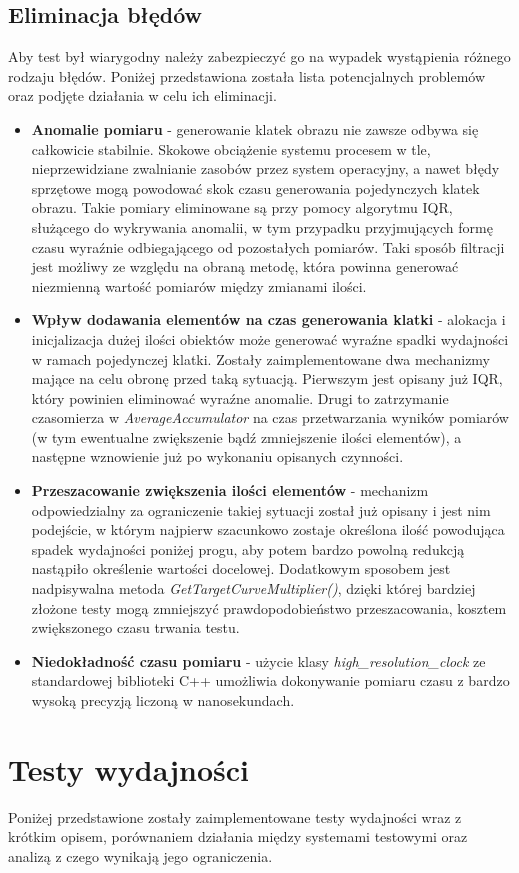 	\subsection{Eliminacja błędów}
	Aby test był wiarygodny należy zabezpieczyć go na wypadek wystąpienia różnego rodzaju błędów. Poniżej przedstawiona została lista potencjalnych problemów oraz podjęte działania w celu ich eliminacji.
	\begin{itemize}
		\item \textbf{Anomalie pomiaru} - generowanie klatek obrazu nie zawsze odbywa się całkowicie stabilnie. Skokowe obciążenie systemu procesem w tle, nieprzewidziane zwalnianie zasobów przez system operacyjny, a nawet błędy sprzętowe mogą powodować skok czasu generowania pojedynczych klatek obrazu. Takie pomiary eliminowane są przy pomocy algorytmu IQR, służącego do wykrywania anomalii, w tym przypadku przyjmujących formę czasu wyraźnie odbiegającego od pozostałych pomiarów. Taki sposób filtracji jest możliwy ze względu na obraną metodę, która powinna generować niezmienną wartość pomiarów między zmianami ilości.
		\item \textbf{Wpływ dodawania elementów na czas generowania klatki} - alokacja i inicjalizacja dużej ilości obiektów może generować wyraźne spadki wydajności w ramach pojedynczej klatki. Zostały zaimplementowane dwa mechanizmy mające na celu obronę przed taką sytuacją. Pierwszym jest opisany już IQR, który powinien eliminować wyraźne anomalie. Drugi to zatrzymanie czasomierza w \textit{AverageAccumulator} na czas przetwarzania wyników pomiarów (w tym ewentualne zwiększenie bądź zmniejszenie ilości elementów), a następne wznowienie już po wykonaniu opisanych czynności. 
		\item \textbf{Przeszacowanie zwiększenia ilości elementów} - mechanizm odpowiedzialny za ograniczenie takiej sytuacji został już opisany i jest nim podejście, w którym najpierw szacunkowo zostaje określona ilość powodująca spadek wydajności poniżej progu, aby potem bardzo powolną redukcją nastąpiło określenie wartości docelowej. Dodatkowym sposobem jest nadpisywalna metoda \textit{GetTargetCurveMultiplier()}, dzięki której bardziej złożone testy mogą zmniejszyć prawdopodobieństwo przeszacowania, kosztem zwiększonego czasu trwania testu.
		\item \textbf{Niedokładność czasu pomiaru} - użycie klasy \textit{high\_resolution\_clock} ze standardowej biblioteki C++ umożliwia dokonywanie pomiaru czasu z bardzo wysoką precyzją liczoną w nanosekundach.
	\end{itemize}
	
	\section{Testy wydajności}
	Poniżej przedstawione zostały zaimplementowane testy wydajności wraz z krótkim opisem, porównaniem działania między systemami testowymi oraz analizą z czego wynikają jego ograniczenia.